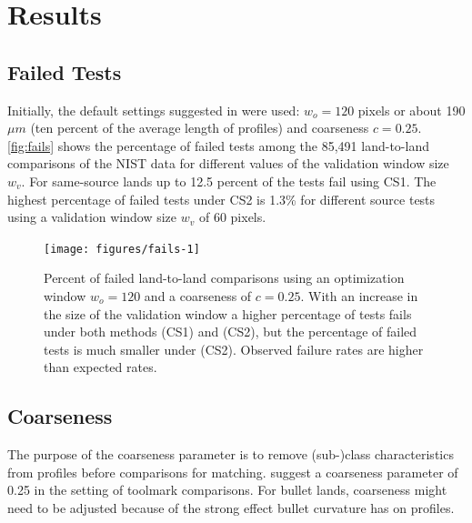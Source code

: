 \documentclass[12pt]{article}
\begin{document}
\section{Results}\label{results}

\subsection{Failed Tests}\label{failed-tests}

Initially, the default settings suggested in \citet{hadler} were used:
\(w_o = 120\) pixels or about 190 \(\mu m\) (ten percent of the average
length of profiles) and coarseness \(c = 0.25\). \autoref{fig:fails}
shows the percentage of failed tests among the 85,491 land-to-land
comparisons of the NIST data for different values of the validation
window size \(w_v\). For same-source lands up to 12.5 percent of the
tests fail using CS1. The highest percentage of failed tests under CS2
is 1.3\% for different source tests using a validation window size
\(w_v\) of 60 pixels.

\begin{figure}

{\centering \texttt{[image: figures/fails-1]} 

}

\caption{Percent of failed land-to-land comparisons using an optimization window $w_o = 120$ and a coarseness of $c = 0.25$. With an increase in the size of the validation window  a higher percentage of tests fails under both methods (CS1) and (CS2), but the percentage of failed tests is much smaller under (CS2). Observed failure rates are higher than expected rates.}\label{fig:fails}
\end{figure}

\subsection{Coarseness}\label{coarseness}

The purpose of the coarseness parameter is to remove (sub-)class
characteristics from profiles before comparisons for matching.
\citet{hadler} suggest a coarseness parameter of 0.25 in the setting of
toolmark comparisons. For bullet lands, coarseness might need to be
adjusted because of the strong effect bullet curvature has on profiles.
\end{document}
